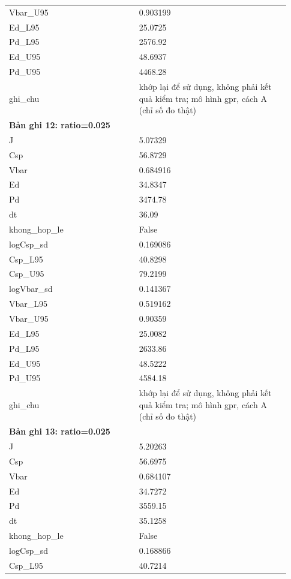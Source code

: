 \begin{longtable}{p{0.43\linewidth}p{0.50\linewidth}}
Vbar\_\allowbreak U95 & 0.903199 \\
Ed\_\allowbreak L95 & 25.0725 \\
Pd\_\allowbreak L95 & 2576.92 \\
Ed\_\allowbreak U95 & 48.6937 \\
Pd\_\allowbreak U95 & 4468.28 \\
ghi\_\allowbreak chu & khớp lại để sử dụng, không phải kết quả kiểm tra; mô hình gpr, cách A (chỉ số đo thật) \\
\midrule
\multicolumn{2}{p{0.95\linewidth}}{\textbf{Bản ghi 12: ratio=0.025}} \\
J & 5.07329 \\
Csp & 56.8729 \\
Vbar & 0.684916 \\
Ed & 34.8347 \\
Pd & 3474.78 \\
dt & 36.09 \\
khong\_\allowbreak hop\_\allowbreak le & False \\
logCsp\_\allowbreak sd & 0.169086 \\
Csp\_\allowbreak L95 & 40.8298 \\
Csp\_\allowbreak U95 & 79.2199 \\
logVbar\_\allowbreak sd & 0.141367 \\
Vbar\_\allowbreak L95 & 0.519162 \\
Vbar\_\allowbreak U95 & 0.90359 \\
Ed\_\allowbreak L95 & 25.0082 \\
Pd\_\allowbreak L95 & 2633.86 \\
Ed\_\allowbreak U95 & 48.5222 \\
Pd\_\allowbreak U95 & 4584.18 \\
ghi\_\allowbreak chu & khớp lại để sử dụng, không phải kết quả kiểm tra; mô hình gpr, cách A (chỉ số đo thật) \\
\midrule
\multicolumn{2}{p{0.95\linewidth}}{\textbf{Bản ghi 13: ratio=0.025}} \\
J & 5.20263 \\
Csp & 56.6975 \\
Vbar & 0.684107 \\
Ed & 34.7272 \\
Pd & 3559.15 \\
dt & 35.1258 \\
khong\_\allowbreak hop\_\allowbreak le & False \\
logCsp\_\allowbreak sd & 0.168866 \\
Csp\_\allowbreak L95 & 40.7214 \\

\end{longtable}
